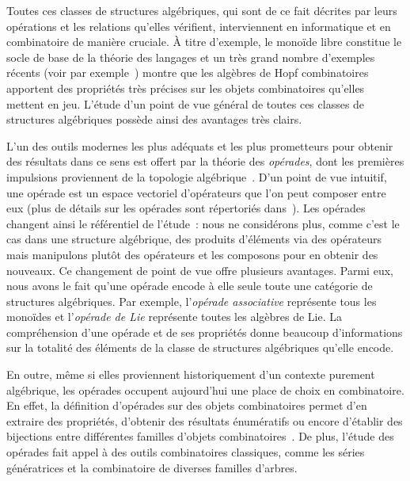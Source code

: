 \documentclass[10pt,reqno]{amsart}
\numberwithin{equation}{subsection}
\begin{document}
Toutes ces classes de structures algébriques, qui sont de ce fait
décrites par leurs opérations et les relations qu'elles vérifient,
interviennent en informatique et en combinatoire de manière cruciale. À
titre d'exemple, le monoïde libre constitue le socle de base de la
théorie des langages et un très grand nombre d'exemples récents (voir
par exemple~\cite{HNT05,Gir12}) montre que les algèbres de Hopf
combinatoires apportent des propriétés très précises sur les objets
combinatoires qu'elles mettent en jeu. L'étude d'un point de vue général
de toutes ces classes de structures algébriques possède ainsi des
avantages très clairs.

L'un des outils modernes les plus adéquats et les plus prometteurs pour
obtenir des résultats dans ce sens est offert par la théorie des
{\em opérades}, dont les premières impulsions proviennent de la
topologie algébrique~\cite{May72}. D'un point de vue intuitif, une opérade
est un espace vectoriel d'opérateurs que l'on peut composer entre eux
(plus de détails sur les opérades sont répertoriés dans~\cite{Mar08,LV12}).
Les opérades changent ainsi le référentiel de l'étude~: nous ne considérons
plus, comme c'est le cas dans une structure algébrique, des produits
d'éléments via des opérateurs mais manipulons plutôt des opérateurs et
les composons pour en obtenir des nouveaux. Ce changement de point de
vue offre plusieurs avantages. Parmi eux, nous avons le fait qu'une
opérade encode à elle seule toute une catégorie de structures algébriques.
Par exemple, l'{\em opérade associative} représente tous les monoïdes et
l'{\em opérade de Lie} représente toutes les algèbres de Lie. La
compréhension d'une opérade et de ses propriétés donne beaucoup
d'informations sur la totalité des éléments de la classe de structures
algébriques qu'elle encode.

En outre, même si elles proviennent historiquement d'un contexte purement
algébrique, les opérades occupent aujourd'hui une place de choix en
combinatoire. En effet, la définition d'opérades sur des objets
combinatoires permet d'en extraire des propriétés, d'obtenir des
résultats énumératifs ou encore d'établir des bijections entre différentes
familles d'objets combinatoires~\cite{Cha08,CG14,Gir15}. De plus, l'étude
des opérades fait appel à des outils combinatoires classiques, comme les
séries génératrices et la combinatoire de diverses familles d'arbres.

\end{document}
